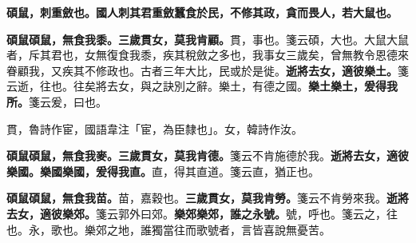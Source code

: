
\textbf{碩鼠，刺重斂也。國人刺其君重斂蠶食於民，不修其政，貪而畏人，若大鼠也。}

\textbf{碩鼠碩鼠，無食我黍。三歲貫女，莫我肯顧。}{\footnotesize 貫，事也。箋云碩，大也。大鼠大鼠者，斥其君也，女無復食我黍，疾其稅斂之多也，我事女三歲矣，曾無教令恩德來眷顧我，又疾其不修政也。古者三年大比，民或於是徙。}\textbf{逝將去女，適彼樂土。}{\footnotesize 箋云逝，往也。往矣將去女，與之訣別之辭。樂土，有德之國。}\textbf{樂土樂土，爰得我所。}{\footnotesize 箋云爰，曰也。}

\begin{quoting}貫，魯詩作宦，國語韋注「宦，為臣隸也」。女，韓詩作汝。\end{quoting}

\textbf{碩鼠碩鼠，無食我麥。三歲貫女，莫我肯德。}{\footnotesize 箋云不肯施德於我。}\textbf{逝將去女，適彼樂國。樂國樂國，爰得我直。}{\footnotesize 直，得其直道。箋云直，猶正也。}

\textbf{碩鼠碩鼠，無食我苗。}{\footnotesize 苗，嘉穀也。}\textbf{三歲貫女，莫我肯勞。}{\footnotesize 箋云不肯勞來我。}\textbf{逝將去女，適彼樂郊。}{\footnotesize 箋云郭外曰郊。}\textbf{樂郊樂郊，誰之永號。}{\footnotesize 號，呼也。箋云之，往也。永，歌也。樂郊之地，誰獨當往而歌號者，言皆喜說無憂苦。}

